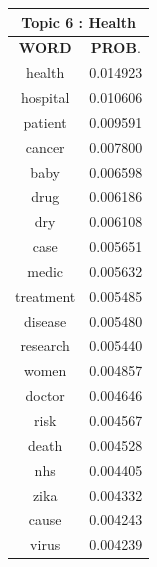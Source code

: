 \begin{table}[h!]
\begin{tabular}{|c c|}
\end{tabular}
 \hfill
 \begin{tabular}{|c c|} 
\hline
\multicolumn{2}{|c|}{\textbf{Topic 6 : Health}} \\
\hline
 \textbf{WORD} & \textbf{PROB}.  \\ [0.3ex] 
 \hline
 health &   0.014923 \\
	hospital  &     0.010606 \\
	patient &      0.009591 \\
	cancer  &     0.007800 \\
	baby  &     0.006598 \\
	drug   &    0.006186 \\
	dry   &    0.006108 \\
	case   &    0.005651 \\
	medic  &     0.005632 \\
	treatment  &     0.005485 \\
	disease   &    0.005480 \\
	research   &    0.005440 \\
	women   &    0.004857 \\
	doctor  &     0.004646 \\
	risk   &    0.004567 \\
	death  &     0.004528 \\
	nhs  &     0.004405 \\
	zika  &     0.004332 \\
	cause   &    0.004243 \\
	virus   &    0.004239 \\ [1ex] 
 \hline
  

\end{tabular}
\end{table}
